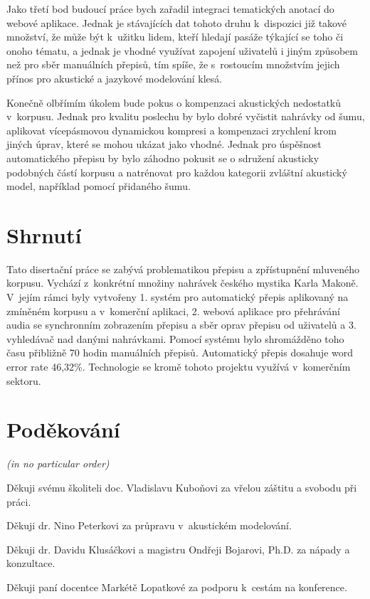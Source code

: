 Jako třetí bod budoucí práce bych zařadil integraci tematických anotací do
webové aplikace. Jednak je stávajících dat tohoto druhu k~dispozici již takové
množství, že může být k~užitku lidem, kteří hledají pasáže týkající se toho či
onoho tématu, a jednak je vhodné využívat zapojení uživatelů i jiným způsobem
než pro sběr manuálních přepisů, tím spíše, že s~rostoucím množstvím jejich
přínos pro akustické a jazykové modelování klesá.

Konečně olbřímím úkolem bude pokus o kompenzaci akustických nedostatků
v~korpusu. Jednak pro kvalitu poslechu by bylo dobré vyčistit nahrávky od šumu,
aplikovat vícepásmovou dynamickou kompresi a kompenzaci zrychlení krom jiných
úprav, které se mohou ukázat jako vhodné. Jednak pro úspěšnost automatického
přepisu by bylo záhodno pokusit se o sdružení akusticky podobných částí korpusu
a natrénovat pro každou kategorii zvláštní akustický model, například pomocí
přidaného šumu.\cite{zur2009noise}\cite{VARGA1993247}

\section{Shrnutí}

Tato disertační práce se zabývá problematikou přepisu a zpřístupnění mluveného
korpusu. Vychází z~konkrétní množiny nahrávek českého mystika Karla Makoně.
V~jejím rámci byly vytvořeny 1. systém pro automatický přepis aplikovaný na zmíněném
korpusu a v~komerční aplikaci, 2. webová aplikace pro přehrávání audia se
synchronním zobrazením přepisu a sběr oprav přepisu od uživatelů a 3.
vyhledávač nad danými nahrávkami. Pomocí systému bylo shromážděno toho času
přibližně 70 hodin manuálních přepisů. Automatický přepis dosahuje word error
rate 46,32\%. Technologie se kromě tohoto projektu využívá v~komerčním sektoru.

\section{Poděkování}

{\em (in no particular order)}

Děkuji svému školiteli doc. Vladislavu Kuboňovi za vřelou záštitu a svobodu při
práci.

Děkuji dr. Nino Peterkovi za průpravu v~akustickém modelování.

Děkuji dr. Davidu Klusáčkovi a magistru Ondřeji Bojarovi, Ph.D. za nápady a konzultace.

Děkuji paní docentce Markétě Lopatkové za podporu k~cestám na konference.

